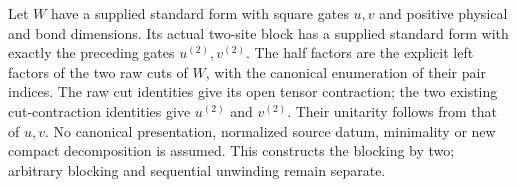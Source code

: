 \begin{lemma}
    \label{lem:mpu_supplied_printed_two_block_standard_form}
    \leanok
    Let $W$ have a supplied standard form with square gates $u,v$ and
    positive physical and bond dimensions. Its actual two-site block has
    a supplied standard form with exactly the preceding gates $u^{(2)},v^{(2)}$.
    The half factors are the explicit left factors of the two raw cuts of
    $W$, with the canonical enumeration of their pair indices.
    The raw cut identities give its open tensor contraction; the two
    existing cut-contraction identities give $u^{(2)}$ and $v^{(2)}$.
    Their unitarity follows from that of $u,v$. No canonical presentation,
    normalized source datum, minimality or new compact decomposition is
    assumed. This constructs the blocking by two; arbitrary blocking and
    sequential unwinding remain separate.
\end{lemma}







